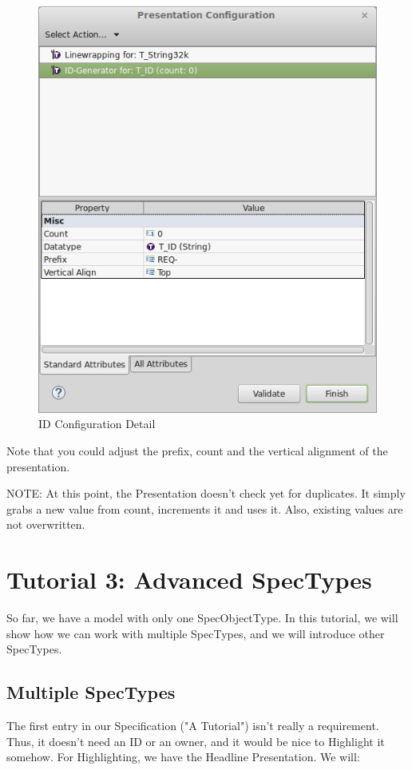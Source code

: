 \begin{figure}[h!]
\centering      
\includegraphics[width=0.8\linewidth]{../rmf-images/presentation_id.png}      
\caption{ID Configuration Detail}      
\label{fig:idConfig}
\end{figure}

Note that you could adjust the prefix, count and the vertical alignment of the presentation.

NOTE: At this point, the Presentation doesn't check yet for duplicates.  It simply grabs a new value from count, increments it and uses it.  Also, existing values are not overwritten.

\section{Tutorial 3: Advanced SpecTypes}

So far, we have a model with only one SpecObjectType.  In this tutorial, we will show how we can work with multiple SpecTypes, and we will introduce other SpecTypes.

\subsection{Multiple SpecTypes}

The first entry in our Specification ("A \pror{} Tutorial") isn't really a requirement.  Thus, it doesn't need an ID or an owner, and it would be nice to Highlight it somehow.  For Highlighting, we have the Headline Presentation.  We will:

